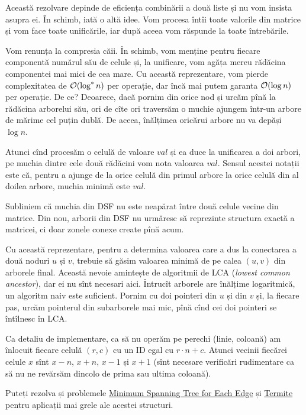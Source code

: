 \documentclass[../main.tex]{subfiles}
\begin{document}
Această rezolvare depinde de eficiența combinării a două liste și nu vom insista asupra ei. În schimb, iată o altă idee. Vom procesa întîi toate valorile din matrice și vom face toate unificările, iar după aceea vom răspunde la toate întrebările.

Vom renunța la compresia căii. În schimb, vom menține pentru fiecare componentă numărul său de celule și, la unificare, vom agăța mereu rădăcina componentei mai mici de cea mare. Cu această reprezentare, vom pierde complexitatea de $\mathcal{O}(\log^{*} n)$ per operație, dar încă mai putem garanta $\mathcal{O}(\log n)$ per operație. De ce? Deoarece, dacă pornim din orice nod și urcăm pînă la rădăcina arborelui său, ori de cîte ori traversăm o muchie ajungem într-un arbore de mărime cel puțin dublă. De aceea, înălțimea oricărui arbore nu va depăși $\log n$.

Atunci cînd procesăm o celulă de valoare $val$ și ea duce la unificarea a doi arbori, pe muchia dintre cele două rădăcini vom nota valoarea $val$. Sensul acestei notații este că, pentru a ajunge de la orice celulă din primul arbore la orice celulă din al doilea arbore, muchia minimă este $val$.

Subliniem că muchia din DSF nu este neapărat între două celule vecine din matrice. Din nou, arborii din DSF nu urmăresc să reprezinte structura exactă a matricei, ci doar zonele conexe create pînă acum.

Cu această reprezentare, pentru a determina valoarea care a dus la conectarea a două noduri $u$ și $v$, trebuie să găsim valoarea minimă de pe calea $(u, v)$ din arborele final. Această nevoie amintește de algoritmii de LCA (\textit{lowest common ancestor}), dar ei nu sînt necesari aici. Întrucît arborele are înălțime logaritmică, un algoritm naiv este suficient. Pornim cu doi pointeri din $u$ și din $v$ și, la fiecare pas, urcăm pointerul din subarborele mai mic, pînă cînd cei doi pointeri se întîlnesc în LCA.

Ca detaliu de implementare, ca să nu operăm pe perechi (linie, coloană) am înlocuit fiecare celulă $(r, c)$ cu un ID egal cu $r \cdot n + c$. Atunci vecinii fiecărei celule $x$ sînt $x - n$, $x + n$, $x - 1$ și $x + 1$ (sînt necesare verificări rudimentare ca să nu ne revărsăm dincolo de prima sau ultima coloană).

Puteți rezolva și problemele \hyperref[problem:mst-for-each-edge]{Minimum Spanning Tree for Each Edge} și \hyperref[problem:termite]{Termite} pentru aplicații mai grele ale acestei structuri.
\end{document}
